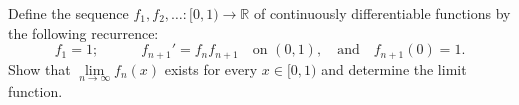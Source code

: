 Define the sequence $f_1,f_2,\ldots :[0,1)\to \mathbb{R}$ of continuously differentiable functions by the following recurrence: $$ f_1=1; \qquad \quad f_{n+1}'=f_nf_{n+1} \quad\text{on $(0,1)$}, \quad \text{and}\quad f_{n+1}(0)=1. $$
Show that $\lim\limits_{n\to \infty}f_n(x)$ exists for every $x\in [0,1)$ and determine the limit function.